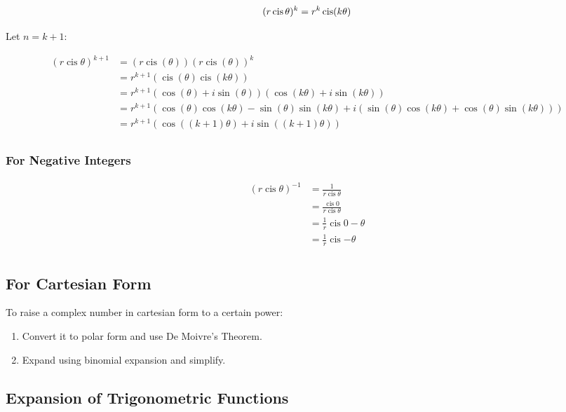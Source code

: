 \documentclass[a4paper,11pt]{report}
\DeclareMathOperator\cis{cis}
\begin{document}
$$
(r \cis{\theta})^k = r^k \cis(k \theta) \\
$$

Let $n = k + 1$:

$$
\begin{aligned}
(r \cis{\theta})^{k + 1} & = (r \cis(\theta))(r \cis(\theta))^k \\
& = r^{k + 1} (\cis(\theta) \cis(k \theta)) \\
& = r^{k + 1} (\cos(\theta) + i \sin(\theta))(\cos(k \theta) + i \sin(k \theta)) \\
& = r^{k + 1} (\cos(\theta) \cos(k \theta) - \sin(\theta) \sin(k \theta) + i(\sin(\theta) \cos(k \theta) + \cos(\theta) \sin(k \theta))) \\
& = r^{k + 1} (\cos((k + 1) \theta) + i \sin((k + 1) \theta)) \\
\end{aligned}
$$

\subsubsection{For Negative Integers}

$$
\begin{aligned}
(r \cis{\theta})^{-1} & = \frac{1}{r \cis{\theta}} \\
& = \frac{\cis{0}}{r \cis{\theta}} \\
& = \frac{1}{r} \cis{0 - \theta} \\
& = \frac{1}{r} \cis{-\theta} \\
\end{aligned}
$$

\subsection{For Cartesian Form}

To raise a complex number in cartesian form to a certain power:

\begin{enumerate}
\item Convert it to polar form and use De Moivre's Theorem.
\item Expand using binomial expansion and simplify.
\end{enumerate}

\subsection{Expansion of Trigonometric Functions}
\end{document}
